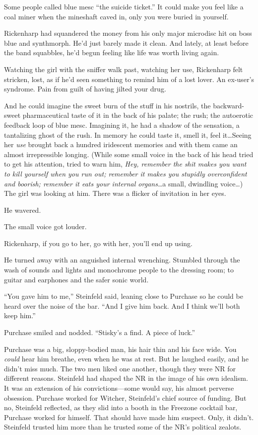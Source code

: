 Some people called blue mesc ``the suicide ticket.'' It could make you feel like a coal miner when the mineshaft caved in, only you were buried in yourself.

Rickenharp had squandered the money from his only major microdisc hit on boss blue and synthmorph. He'd just barely made it clean. And lately, at least before the band squabbles, he'd begun feeling like life was worth living again.

Watching the girl with the sniffer walk past, watching her use, Rickenharp felt stricken, lost, as if he'd seen something to remind him of a lost lover. An ex-user's syndrome. Pain from guilt of having jilted your drug.

And he could imagine the sweet burn of the stuff in his nostrils, the backward-sweet pharmaceutical taste of it in the back of his palate; the rush; the autoerotic feedback loop of blue mesc. Imagining it, he had a shadow of the sensation, a tantalizing ghost of the rush. In memory he could taste it, smell it, feel it\ldots Seeing her \textit{use} brought back a hundred iridescent memories and with them came an almost irrepressible longing. (While some small voice in the back of his head tried to get his attention, tried to warn him, \textit{Hey, remember the shit makes you want to kill yourself when you run out; remember it makes you stupidly overconfident and boorish; remember it eats your internal organs}\ldots a small, dwindling voice\ldots ) The girl was looking at him. There was a flicker of invitation in her eyes.

He wavered.

The small voice got louder.

Rickenharp, if you go to her, go with her, you'll end up using.

He turned away with an anguished internal wrenching. Stumbled through the wash of sounds and lights and monochrome people to the dressing room; to guitar and earphones and the safer sonic world.

``You gave him to me,'' Steinfeld said, leaning close to Purchase so he could be heard over the noise of the bar. ``And I give him back. And I think we'll both keep him.''

Purchase smiled and nodded. ``Stisky's a find. A piece of luck.''

Purchase was a big, sloppy-bodied man, his hair thin and his face wide. You \textit{could} hear him breathe, even when he was at rest. But he laughed easily, and he didn't miss much. The two men liked one another, though they were NR for different reasons. Steinfeld had shaped the NR in the image of his own idealism. It was an extension of his convictions---some would say, his almost perverse obsession. Purchase worked for Witcher, Steinfeld's chief source of funding. But no, Steinfeld reflected, as they slid into a booth in the Freezone cocktail bar, Purchase worked for himself. That should have made him suspect. Only, it didn't. Steinfeld trusted him more than he trusted some of the NR's political zealots.

